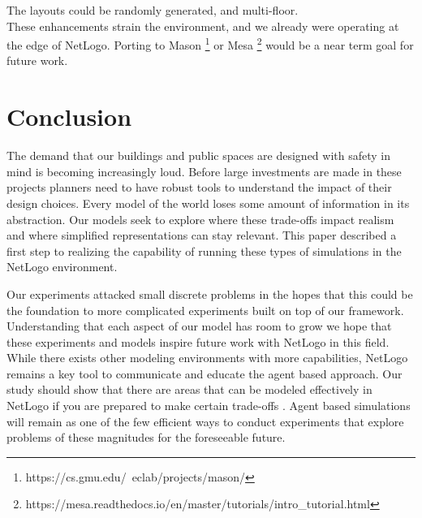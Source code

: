 \documentclass[12pt,letterpaper]{article}
\begin{document}
The layouts could be randomly generated, and multi-floor. \\

These enhancements strain the environment, and we already were operating at the
edge of NetLogo. Porting to Mason
\footnote{https://cs.gmu.edu/~eclab/projects/mason/} or Mesa
\footnote{https://mesa.readthedocs.io/en/master/tutorials/intro\_tutorial.html}
would be a near term goal for future work.

\section {Conclusion}

The demand that our buildings and public spaces are designed with safety in mind is becoming increasingly loud.  Before large investments are made in these projects planners need to have robust tools to understand the impact of their design choices.  Every model of the world loses some amount of information in its abstraction.  Our models seek to explore where these trade-offs impact realism and where simplified representations can stay relevant.  This paper described a first step to realizing the capability of running these types of simulations in the NetLogo environment.

Our experiments attacked small discrete problems in the hopes that this could be the foundation to more complicated experiments built on top of our framework.  Understanding that each aspect of our model has room to grow we hope that these experiments and models inspire future work with NetLogo in this field.  While there exists other modeling environments with more capabilities, NetLogo remains a key tool to communicate and educate the agent based approach.  Our study should show that there are areas that can be modeled effectively in NetLogo if you are prepared to make certain trade-offs .  Agent based simulations will remain as one of the few efficient ways to conduct experiments that explore problems of these magnitudes for the foreseeable future.
\end{document}
